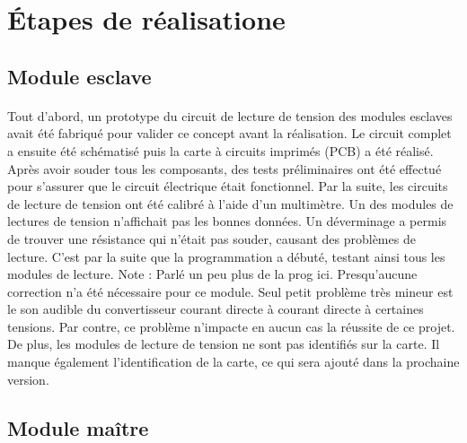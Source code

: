 \section{Étapes de réalisatione}

	\paragraph{}

	\subsection{Module esclave}
	
		\paragraph{}
		Tout d’abord, un prototype du circuit de lecture de tension des modules esclaves avait été fabriqué pour valider ce concept avant la réalisation. Le circuit complet a ensuite été schématisé puis la carte à circuits imprimés (PCB) a été réalisé. Après avoir souder tous les composants, des tests préliminaires ont été effectué pour s’assurer que le circuit électrique était fonctionnel.
		Par la suite, les circuits de lecture de tension ont été calibré à l’aide d’un multimètre. Un des modules de lectures de tension n’affichait pas les bonnes données. Un déverminage a permis de trouver une résistance qui n’était pas souder, causant des problèmes de lecture. C’est par la suite que la programmation a débuté, testant ainsi tous les modules de lecture. 
		Note : Parlé un peu plus de la prog ici.
		Presqu’aucune correction n’a été nécessaire pour ce module. Seul petit problème très mineur est le son audible du convertisseur courant directe à courant directe à certaines tensions. Par contre, ce problème n’impacte en aucun cas la réussite de ce projet. De plus, les modules de lecture de tension ne sont pas identifiés sur la carte. Il manque également l’identification de la carte, ce qui sera ajouté dans la prochaine version.
	
	\subsection{Module maître}
	
